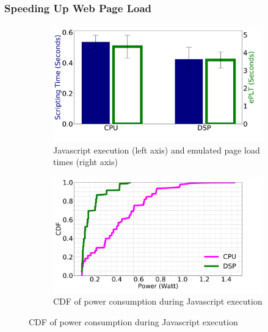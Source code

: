 
\subsubsection{Speeding Up Web Page Load} \label{label:whatif}

\begin{figure}
    \begin{subfigure}[b]{0.5\textwidth}
        \centering
        \includegraphics[width=1\linewidth]{sections/device-work/dsp-plt}
        \caption{Javascript execution (left axis) and emulated page load times (right axis)}
    \end{subfigure}
    \begin{subfigure}[b]{0.5\textwidth}
        \centering
        \includegraphics[width=1\linewidth]{sections/device-work/dsp-power}
        \caption{CDF of power consumption during Javascript execution}
    \end{subfigure}%


\end{figure}
